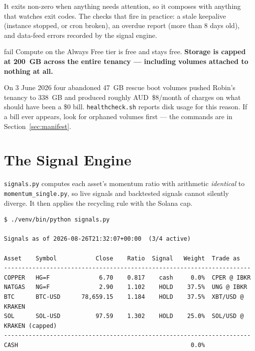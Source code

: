 \documentclass[11pt,a4paper]{article}
\begin{document}
It exits non-zero when anything needs attention, so it composes with
anything that watches exit codes. The checks that fire in practice: a
stale keepalive (instance stopped, or cron broken), an overdue report
(more than 8 days old), and data-feed errors recorded by the signal
engine.

\begin{resultbox}{fail}
Compute on the Always Free tier is free and stays free.
\textbf{Storage is capped at 200~GB across the entire tenancy ---
including volumes attached to nothing at all.}

On 3 June 2026 four abandoned 47~GB rescue boot volumes pushed Robin's
tenancy to 338~GB and produced roughly AUD~\$8/month of charges on what
should have been a \$0 bill. \texttt{healthcheck.sh} reports disk usage
for this reason. If a bill ever appears, look for orphaned volumes
first --- the commands are in Section~\ref{sec:manifest}.
\end{resultbox}

\section{The Signal Engine}

\texttt{signals.py} computes each asset's momentum ratio with arithmetic
\emph{identical} to \texttt{momentum\_single.py}, so live signals and
backtested signals cannot silently diverge. It then applies the
recycling rule with the Solana cap.

\begin{codebox}
\begin{lstlisting}[style=shell]
$ ./venv/bin/python signals.py

Signals as of 2026-08-26T21:32:07+00:00  (3/4 active)

Asset    Symbol           Close    Ratio  Signal   Weight  Trade as
----------------------------------------------------------------------
COPPER   HG=F              6.70    0.817    cash     0.0%  CPER @ IBKR
NATGAS   NG=F              2.90    1.102    HOLD    37.5%  UNG @ IBKR
BTC      BTC-USD      78,659.15    1.184    HOLD    37.5%  XBT/USD @ KRAKEN
SOL      SOL-USD          97.59    1.302    HOLD    25.0%  SOL/USD @ KRAKEN (capped)
----------------------------------------------------------------------
CASH                                                 0.0%
\end{lstlisting}
\end{codebox}
\end{document}
